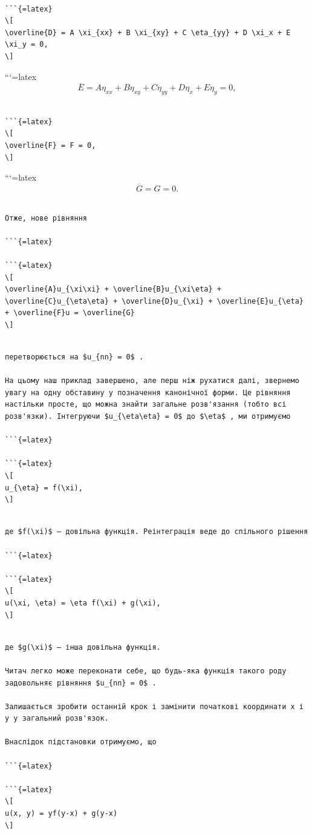 \documentclass[
]{article}
\begin{document}
\begin{verbatim}

```{=latex}
\[
\overline{D} = A \xi_{xx} + B \xi_{xy} + C \eta_{yy} + D \xi_x + E \xi_y = 0,
\]
\end{verbatim}

```{=latex}
\[
\overline{E} = A \eta_{xx} + B \eta_{xy} + C \eta_{yy} + D \eta_x + E \eta_y = 0,
\]

\begin{verbatim}

```{=latex}
\[
\overline{F} = F = 0,
\]
\end{verbatim}

```{=latex}
\[
\overline{G} = G = 0.
\]

\begin{verbatim}

Отже, нове рівняння

```{=latex}

```{=latex}
\[
\overline{A}u_{\xi\xi} + \overline{B}u_{\xi\eta} + \overline{C}u_{\eta\eta} + \overline{D}u_{\xi} + \overline{E}u_{\eta} + \overline{F}u = \overline{G}
\]
\end{verbatim}

\begin{verbatim}

перетворюється на $u_{nn} = 0$ .

На цьому наш приклад завершено, але перш ніж рухатися далі, звернемо увагу на одну обставину у позначення канонічної форми. Це рівняння настільки просте, що можна знайти загальне розв'язання (тобто всі розв'язки). Інтегруючи $u_{\eta\eta} = 0$ до $\eta$ , ми отримуємо

```{=latex}

```{=latex}
\[
u_{\eta} = f(\xi),
\]
\end{verbatim}

\begin{verbatim}

де $f(\xi)$ — довільна функція. Реінтеграція веде до спільного рішення

```{=latex}

```{=latex}
\[
u(\xi, \eta) = \eta f(\xi) + g(\xi),
\]
\end{verbatim}

\begin{verbatim}

де $g(\xi)$ — інша довільна функція.

Читач легко може переконати себе, що будь-яка функція такого роду задовольняє рівняння $u_{nn} = 0$ .

Залишається зробити останній крок і замінити початкові координати x і y у загальний розв'язок.

Внаслідок підстановки отримуємо, що

```{=latex}

```{=latex}
\[
u(x, y) = yf(y-x) + g(y-x)
\]
\end{verbatim}
\end{document}
